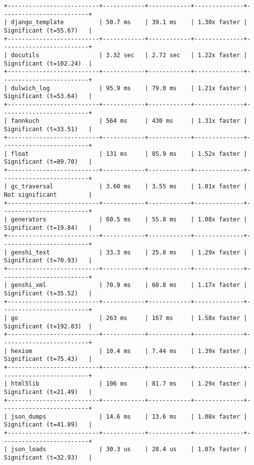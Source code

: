 \begin{code}
\begin{verbatim}
+--------------------------+------------+------------+--------------+-------------------------+
| django_template          | 50.7 ms    | 39.1 ms    | 1.30x faster | Significant (t=55.67)   |
+--------------------------+------------+------------+--------------+-------------------------+
| docutils                 | 3.32 sec   | 2.72 sec   | 1.22x faster | Significant (t=102.24)  |
+--------------------------+------------+------------+--------------+-------------------------+
| dulwich_log              | 95.9 ms    | 79.0 ms    | 1.21x faster | Significant (t=53.64)   |
+--------------------------+------------+------------+--------------+-------------------------+
| fannkuch                 | 564 ms     | 430 ms     | 1.31x faster | Significant (t=33.51)   |
+--------------------------+------------+------------+--------------+-------------------------+
| float                    | 131 ms     | 85.9 ms    | 1.52x faster | Significant (t=89.70)   |
+--------------------------+------------+------------+--------------+-------------------------+
| gc_traversal             | 3.60 ms    | 3.55 ms    | 1.01x faster | Not significant         |
+--------------------------+------------+------------+--------------+-------------------------+
| generators               | 60.5 ms    | 55.8 ms    | 1.08x faster | Significant (t=19.84)   |
+--------------------------+------------+------------+--------------+-------------------------+
| genshi_text              | 33.3 ms    | 25.8 ms    | 1.29x faster | Significant (t=70.93)   |
+--------------------------+------------+------------+--------------+-------------------------+
| genshi_xml               | 70.9 ms    | 60.8 ms    | 1.17x faster | Significant (t=35.52)   |
+--------------------------+------------+------------+--------------+-------------------------+
| go                       | 263 ms     | 167 ms     | 1.58x faster | Significant (t=192.83)  |
+--------------------------+------------+------------+--------------+-------------------------+
| hexiom                   | 10.4 ms    | 7.44 ms    | 1.39x faster | Significant (t=75.43)   |
+--------------------------+------------+------------+--------------+-------------------------+
| html5lib                 | 106 ms     | 81.7 ms    | 1.29x faster | Significant (t=21.49)   |
+--------------------------+------------+------------+--------------+-------------------------+
| json_dumps               | 14.6 ms    | 13.6 ms    | 1.08x faster | Significant (t=41.89)   |
+--------------------------+------------+------------+--------------+-------------------------+
| json_loads               | 30.3 us    | 28.4 us    | 1.07x faster | Significant (t=32.93)   |

\end{verbatim}
\end{code}
